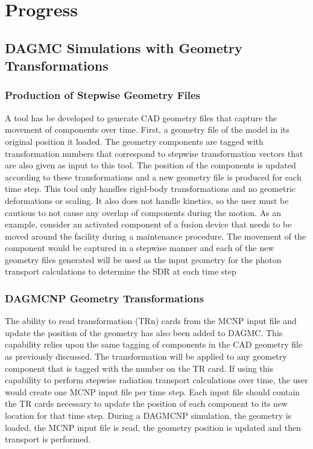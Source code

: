 \chapter{Progress} \label{ch:progress}

\section{DAGMC Simulations with Geometry Transformations}\label{sec:dagmc_trans}

\subsection{Production of Stepwise Geometry Files}\label{sec:timestep_geoms}
A tool has be developed to generate CAD geometry files that capture the 
movement of components over time.  First, a geometry file of the model in its 
original position it loaded.  The geometry components are tagged with 
transformation numbers that correspond to stepwise transformation vectors
 that are also given as input to this tool.  The position of the components 
is updated according to these transformations and a new geometry file is 
produced for each time step.  This tool only handles rigid-body transformations
 and no geometric deformations or scaling.  It also does not handle kinetics, 
so the user must be cautious to not cause any overlap of components during the
 motion.  As an example, consider an activated component of a fusion device 
that needs to be moved around the facility during a maintenance procedure.  
The movement of the component would be captured in a stepwise manner and each of
 the new geometry files generated will be used as the input geometry for the
 photon transport calculations to determine the SDR at each time step

\subsection{DAGMCNP Geometry Transformations}\label{sec:mcnp_tr}
The ability to read transformation (TRn) cards from the MCNP input file and 
update the position of the geometry has also been added to DAGMC.  This
 capability relies upon the same tagging of components in the CAD geometry 
file as previously discussed.  The transformation will be applied to any 
geometry component that is tagged with the number on the TR card.  If using 
this capability to perform stepwise radiation transport calculations over time, 
the user would create one MCNP input file per time step.  Each input file 
should contain the TR cards necessary to update the position of each component 
to its new location for that time step.  During a DAGMCNP simulation, the 
geometry is loaded, the MCNP input file is read, the geometry position is 
updated and then transport is performed.


